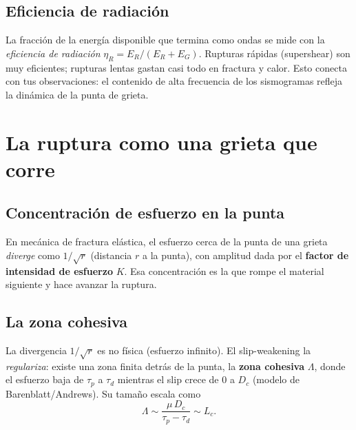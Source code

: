 \documentclass[11pt,a4paper]{article}
\newcommand{\Dc}{D_c}
\newcommand{\taup}{\tau_p}
\newcommand{\taud}{\tau_d}
\begin{document}
\subsection{Eficiencia de radiación}
La fracción de la energía disponible que termina como ondas se mide con la
\emph{eficiencia de radiación} $\eta_R=E_R/(E_R+E_G)$. Rupturas rápidas
(supershear) son muy eficientes; rupturas lentas gastan casi todo en fractura y
calor. Esto conecta con tus observaciones: el contenido de alta frecuencia de los
sismogramas refleja la dinámica de la punta de grieta.

\section{La ruptura como una grieta que corre}

\subsection{Concentración de esfuerzo en la punta}
En mecánica de fractura elástica, el esfuerzo cerca de la punta de una grieta
\emph{diverge} como $1/\sqrt{r}$ (distancia $r$ a la punta), con amplitud dada por
el \textbf{factor de intensidad de esfuerzo} $K$. Esa concentración es la que
rompe el material siguiente y hace avanzar la ruptura.

\begin{center}
\end{center}

\subsection{La zona cohesiva}
La divergencia $1/\sqrt r$ es no física (esfuerzo infinito). El slip-weakening la
\emph{regulariza}: existe una zona finita detrás de la punta, la \textbf{zona
cohesiva} $\Lambda$, donde el esfuerzo baja de $\taup$ a $\taud$ mientras el slip
crece de $0$ a $\Dc$ (modelo de Barenblatt/Andrews). Su tamaño escala como
\begin{equation}
  \Lambda \sim \frac{\mu\,\Dc}{\taup-\taud}\sim L_c.
\end{equation}
\end{document}
